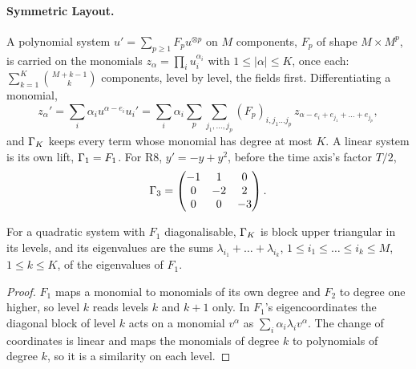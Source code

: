 \paragraph{Symmetric Layout.} A polynomial system $u'=\sum_{p\ge1}F_pu^{\otimes p}$ on $M$ components, $F_p$ of shape $M\times M^p$, is carried on the monomials $z_\alpha=\prod_iu_i^{\alpha_i}$ with $1\le|\alpha|\le K$, once each: $\sum_{k=1}^K\binom{M+k-1}{k}$ components, level by level, the fields first. Differentiating a monomial,
\begin{equation}
    z_\alpha'=\sum_i\alpha_iu^{\alpha-e_i}u_i'
    =\sum_i\alpha_i\sum_p\sum_{j_1,\dots,j_p}(F_p)_{i,j_1\dots j_p}\,z_{\alpha-e_i+e_{j_1}+\dots+e_{j_p}},
\end{equation}
and $\Gamma_K$ keeps every term whose monomial has degree at most $K$. A linear system is its own lift, $\Gamma_1=F_1$. For R8, $y'=-y+y^2$, before the time axis's factor $T/2$,
\begin{equation}
    \Gamma_3=\begin{pmatrix}-1 & 1 & 0\\ 0 & -2 & 2\\ 0 & 0 & -3\end{pmatrix}.
\end{equation}

\begin{proposition}
\label{prop:carleman-spectrum}
For a quadratic system with $F_1$ diagonalisable, $\Gamma_K$ is block upper triangular in its levels, and its eigenvalues are the sums $\lambda_{i_1}+\dots+\lambda_{i_k}$, $1\le i_1\le\dots\le i_k\le M$, $1\le k\le K$, of the eigenvalues of $F_1$.
\end{proposition}
\begin{proof}
$F_1$ maps a monomial to monomials of its own degree and $F_2$ to degree one higher, so level $k$ reads levels $k$ and $k+1$ only. In $F_1$'s eigencoordinates the diagonal block of level $k$ acts on a monomial $v^\alpha$ as $\sum_i\alpha_i\lambda_iv^\alpha$. The change of coordinates is linear and maps the monomials of degree $k$ to polynomials of degree $k$, so it is a similarity on each level.
\end{proof}

